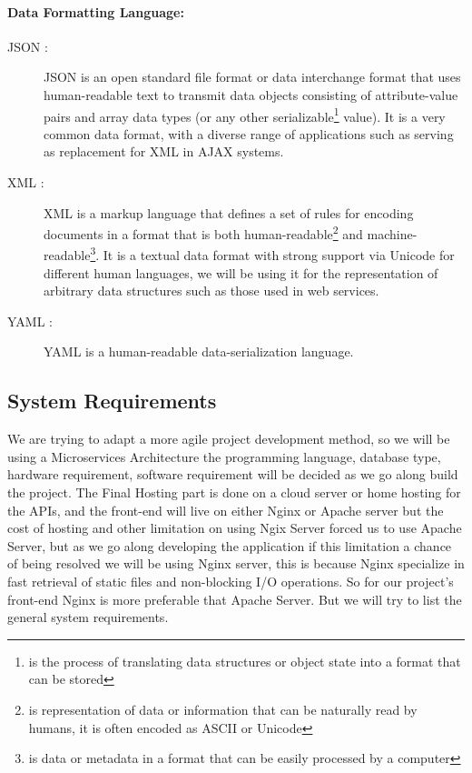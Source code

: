 \paragraph{Data Formatting Language:}
\begin{description}
	\item[JSON : ] JSON is an open standard file format or data interchange format that uses human-readable text to transmit data objects consisting of attribute-value pairs and array data types (or any other serializable\footnote{is the process of translating data structures or object state into a format that can be stored} value). It is a very common data format, with a diverse range of applications such as serving as replacement for XML in AJAX systems.
	\item[XML : ] XML is a markup language that defines a set of rules for encoding documents in a format that is both human-readable\footnote{is representation of data or information that can be naturally read by humans, it is often encoded as ASCII or Unicode} and machine-readable\footnote{is data or metadata in a format that can be easily processed by a computer}. It is a textual data format with strong support via Unicode for different human languages, we will be using it for the representation of arbitrary data structures such as those used in web services.
	\item[YAML : ] YAML is a human-readable data-serialization language.
\end{description}

\subsection{System Requirements}
\label{software_requirements}
We are trying to adapt a more agile project development method, so we will be using a Microservices Architecture the programming language, database type, hardware requirement, software requirement will be decided as we go along build the project.
The Final Hosting part is done on a cloud server or home hosting for the APIs, and the front-end will live on either Nginx or Apache server but the cost of hosting and other limitation on using Ngix Server forced us to use Apache Server, but as we go along developing the application if this limitation a chance of being resolved we will be using Nginx server, this is because Nginx specialize in fast retrieval of 	static files and non-blocking I/O operations. So for our project’s front-end Nginx is more preferable that Apache Server. But we will try to list the general system requirements.

